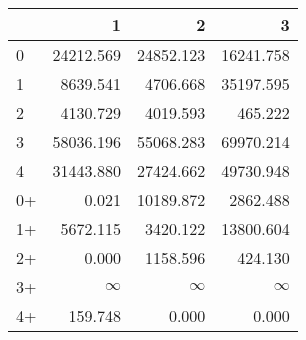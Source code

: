 \begin{tabular}{lrrr}
\toprule
     &         1 &         2 &         3 \\
\midrule
 0   & \num{24212.569} & \num{24852.123} & \num{16241.758} \\
 1   &  \num{8639.541} &  \num{4706.668} & \num{35197.595} \\
 2   &  \num{4130.729} &  \num{4019.593} &   \num{465.222} \\
 3   & \num{58036.196} & \num{55068.283} & \num{69970.214} \\
 4   & \num{31443.880} & \num{27424.662} & \num{49730.948} \\
 0+  &     \num{0.021} & \num{10189.872} &  \num{2862.488} \\
 1+  &  \num{5672.115} &  \num{3420.122} & \num{13800.604} \\
 2+  &     \num{0.000} &  \num{1158.596} &   \num{424.130} \\
 3+  &  $\infty$    &  $\infty$    &  $\infty$    \\
 4+  &   \num{159.748} &     \num{0.000} &     \num{0.000} \\
\bottomrule
\end{tabular}